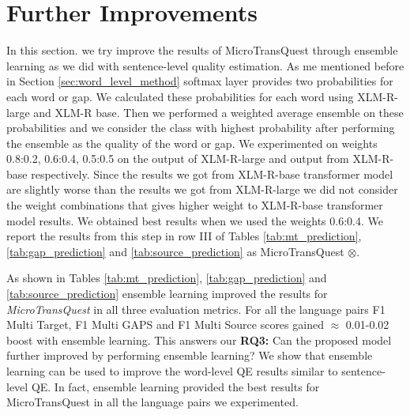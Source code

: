 \section{Further Improvements}
\label{sec:word_level_finetune}
In this section. we try improve the results of MicroTransQuest through ensemble learning as we did with sentence-level quality estimation. As me mentioned before in Section \ref{sec:word_level_method} softmax layer provides two probabilities for each word or gap. We calculated these probabilities for each word using XLM-R-large and XLM-R base. Then we performed a weighted average ensemble on these probabilities and we consider the class with highest probability after performing the ensemble as the quality of the word or gap. We experimented on weights 0.8:0.2, 0.6:0.4, 0.5:0.5 on the output of XLM-R-large and output from XLM-R-base respectively. Since the results we got from XLM-R-base transformer model are slightly worse than the results we got from XLM-R-large we did not consider the weight combinations that gives higher weight to XLM-R-base transformer model results. We obtained best results when we used the weights 0.6:0.4. We report the results from this step in row III of Tables \ref{tab:mt_prediction}, \ref{tab:gap_prediction} and \ref{tab:source_prediction} as MicroTransQuest $\otimes$.

As shown in Tables \ref{tab:mt_prediction}, \ref{tab:gap_prediction} and \ref{tab:source_prediction} ensemble learning improved the results for \textit{MicroTransQuest} in all three evaluation metrics. For all the language pairs F1 Multi Target, F1 Multi GAPS and F1 Multi Source scores gained $\approx$ 0.01-0.02 boost with ensemble learning. This answers our \textbf{RQ3:} Can the proposed model further improved by performing ensemble learning? We show that ensemble learning can be used to improve the word-level QE results similar to sentence-level QE. In fact, ensemble learning provided the best results for MicroTransQuest in all the language pairs we experimented.

